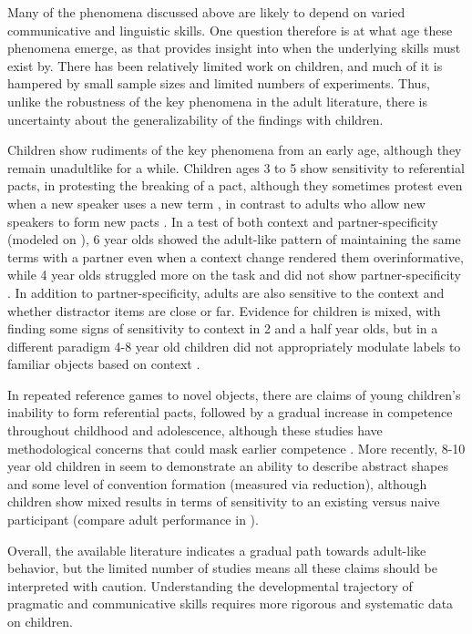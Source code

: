 \documentclass[]{article}
\begin{document}
Many of the phenomena discussed above are likely to depend on varied communicative and linguistic skills. One question therefore is at what age these phenomena emerge, as that provides insight into when the underlying skills must exist by. There has been relatively limited work on children, and much of it is hampered by small sample sizes and limited numbers of experiments. Thus, unlike the robustness of the key phenomena in the adult literature, there is uncertainty about the generalizability of the findings with children. 

Children show rudiments of the key phenomena from an early age, although they remain unadultlike for a while. Children ages 3 to 5 show sensitivity to referential pacts, in protesting the breaking of a pact, although they sometimes protest even when a new speaker uses a new term \citep{matthews2010}, in contrast to adults who allow new speakers to form new pacts \citep{metzing2003a}. In a test of both context and partner-specificity (modeled on \citet{brennan1996}), 6 year olds showed the adult-like pattern of maintaining the same terms with a partner even when a context change rendered them overinformative, while 4 year olds struggled more on the task and did not show partner-specificity \citep{koymen2014}.  	In addition to partner-specificity, adults are also sensitive to the context and whether distractor items are close or far. Evidence for children is mixed, with \citet{abbot-smith2016} finding some signs of sensitivity to context in 2 and a half year olds, but in a different paradigm 4-8 year old children did not appropriately modulate labels to familiar objects based on context \citep{leung2023}.

In repeated reference games to novel objects, there are claims of young children's inability to form referential pacts, followed by a gradual increase in competence throughout childhood and adolescence, although these studies have methodological concerns that could mask earlier competence \citep{glucksberg1967, glucksberg1966}. More recently, 8-10 year old children in \citet{branigan2016} seem to demonstrate an ability to describe abstract shapes and some level of convention formation (measured via reduction), although children show mixed results in terms of sensitivity to an existing versus naive participant (compare adult performance in \citet{wilkes-gibbs1992}). 
	
Overall, the available literature indicates a gradual path towards adult-like behavior, but the limited number of studies means all these claims should be interpreted with caution. Understanding the developmental trajectory of pragmatic and communicative skills requires more rigorous and systematic data on children. 
 
\end{document}
